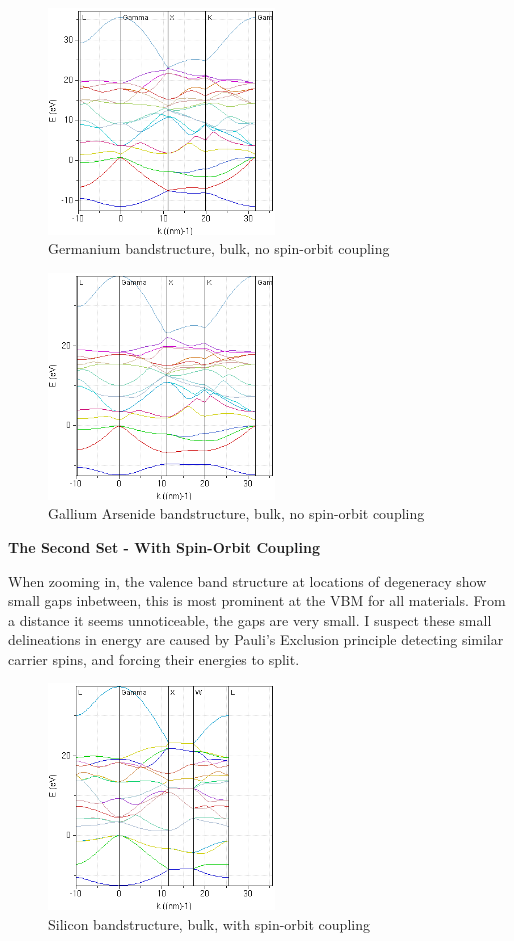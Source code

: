 \documentclass{IEEEtran}
\begin{document}
\begin{figure}[!ht] 
    \centering
    \includegraphics*[width = 6cm]{ge-bands-firstset.png}
    \caption{Germanium bandstructure, bulk, no spin-orbit coupling}
    \label{fig:ge-first-set}
\end{figure}    

\begin{figure}[!ht] 
    \centering
    \includegraphics*[width = 6cm]{gaas-bands-firstset.png}
    \caption{Gallium Arsenide bandstructure, bulk, no spin-orbit coupling}
    \label{fig:gaas-first-set}
\end{figure}    

\bigskip

\textbf{The Second Set - With Spin-Orbit Coupling}

When zooming in, the valence band structure at locations of degeneracy show small gaps inbetween, this is most prominent at the VBM for all materials. From a distance it seems unnoticeable, the gaps are very small. I suspect these small delineations in energy are caused by Pauli's Exclusion principle detecting similar carrier spins, and forcing their energies to split.

\begin{figure}[!ht] 
    \centering
    \includegraphics*[width = 6cm]{si-bands-secondset.png}
    \caption{Silicon bandstructure, bulk, with spin-orbit coupling}
    \label{fig:si-second-set}
\end{figure}    
\end{document}

